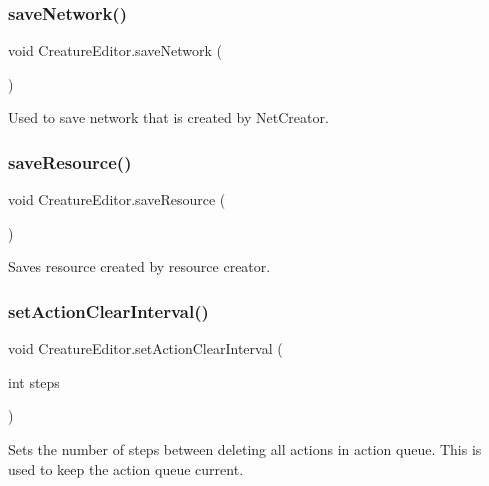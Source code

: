 \subsubsection{\texorpdfstring{save\+Network()}{saveNetwork()}}
{\footnotesize\ttfamily void Creature\+Editor.\+save\+Network (\begin{DoxyParamCaption}{ }\end{DoxyParamCaption})}



Used to save network that is created by Net\+Creator. 

\mbox{\label{class_creature_editor_af35082ae3f97f9385b6d27efb1528e7c}} 
\subsubsection{\texorpdfstring{save\+Resource()}{saveResource()}}
{\footnotesize\ttfamily void Creature\+Editor.\+save\+Resource (\begin{DoxyParamCaption}{ }\end{DoxyParamCaption})}



Saves resource created by resource creator. 

\mbox{\label{class_creature_editor_a1dec102cd9c1c32e2f0639a627203c7f}} 
\subsubsection{\texorpdfstring{set\+Action\+Clear\+Interval()}{setActionClearInterval()}}
{\footnotesize\ttfamily void Creature\+Editor.\+set\+Action\+Clear\+Interval (\begin{DoxyParamCaption}\item[{int}]{steps }\end{DoxyParamCaption})}



Sets the number of steps between deleting all actions in action queue. This is used to keep the action queue current. 

\mbox{\label{class_creature_editor_a463412404c7ed5f27208b742318f193d}} 
